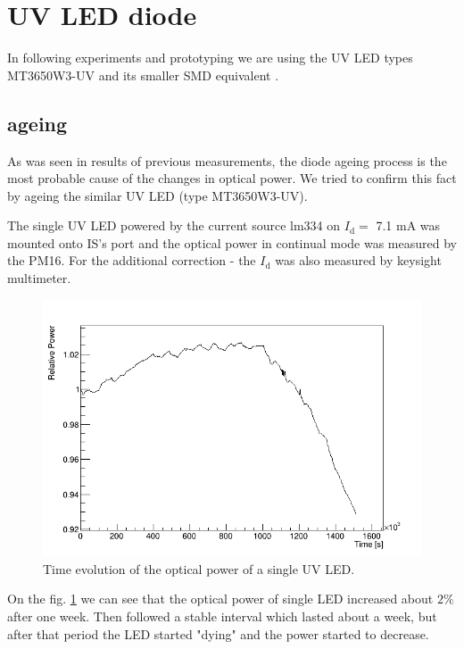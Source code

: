 \section{UV LED diode}

In following experiments and prototyping we are using the UV LED types MT3650W3-UV and its smaller SMD equivalent  .

\subsection{ageing}
As was seen in results of previous measurements, the diode ageing process is the most probable cause of the changes in optical power. We tried to confirm this fact by ageing the similar UV LED (type MT3650W3-UV).
\par
The single UV LED powered by the current source lm334 on $I_\textrm{d} =$ 7.1 mA was mounted onto IS's port and the optical power in continual mode was measured by the PM16. For the additional correction - the $I_\textrm{d} $ was also measured by keysight multimeter.


\par
\begin{figure}[H]
 \centering
 \includegraphics[scale=0.5]{./pictures/corrected1}
 \caption{Time evolution of the optical power of a single UV LED.}
 \label{SingleDiod}
\end{figure}
\par
On the fig. \ref{SingleDiod} we can see that the optical power of single LED increased about $2 \%$ after one week. Then followed a stable interval which lasted about a week, but after that period the LED started "dying" and the power started to decrease.

